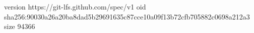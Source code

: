 version https://git-lfs.github.com/spec/v1
oid sha256:90030a26a20ba8dad5b29691635c87cce10a09f13b72cfb705882c0698a212a3
size 94366
